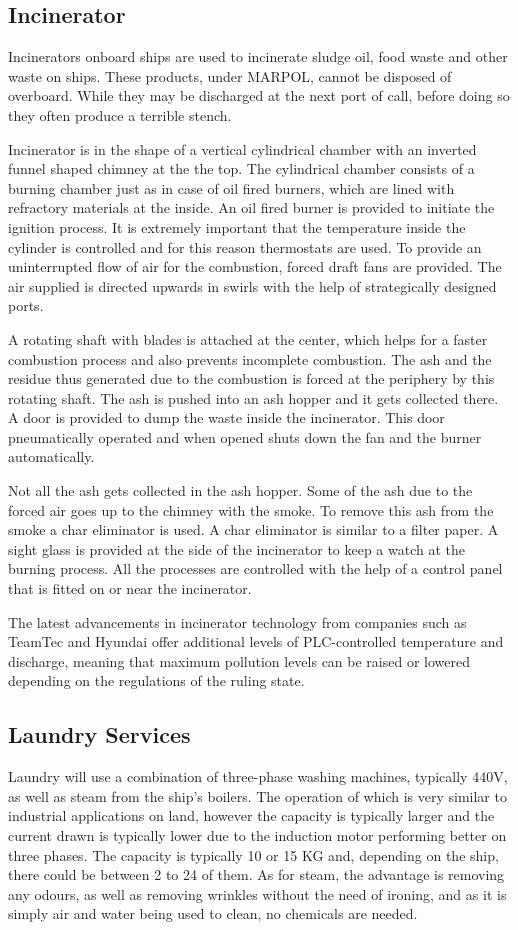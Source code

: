\documentclass[11pt,a4paper]{article}
\begin{document}
\subsection{Incinerator}
Incinerators onboard ships are used to incinerate sludge oil, food waste and other waste on ships. These products, under MARPOL, cannot be disposed of overboard. While they may be discharged at the next port of call, before doing so they often produce a terrible stench.

Incinerator is in the shape of a vertical cylindrical chamber with an inverted funnel shaped chimney at the the top. The cylindrical chamber consists of a burning chamber just as in case of oil fired burners, which are lined with refractory materials at the inside. An oil fired burner is provided to initiate the ignition process. It is extremely important that the temperature inside the cylinder is controlled and for this reason thermostats are used. To provide an uninterrupted flow of air for the combustion, forced draft fans are provided. The air supplied is directed upwards in swirls with the help of strategically designed ports.

A rotating shaft with blades is attached at the center, which helps for a faster combustion process and also prevents incomplete combustion. The ash and the residue thus generated due to the combustion is forced at the periphery by this rotating shaft. The ash is pushed into an ash hopper and it gets collected there. A door is provided to dump the waste inside the incinerator. This door pneumatically operated and when opened shuts down the fan and the burner automatically.

Not all the ash gets collected in the ash hopper. Some of the ash due to the forced air goes up to the chimney with the smoke. To remove this ash from the smoke a char eliminator is used. A char eliminator is similar to a filter paper. A sight glass is provided at the side of the incinerator to keep a watch at the burning process. All the processes are controlled with the help of a control panel that is fitted on or near the incinerator.

The latest advancements in incinerator technology from companies such as TeamTec and Hyundai offer additional levels of PLC-controlled temperature and discharge, meaning that maximum pollution levels can be raised or lowered depending on the regulations of the ruling state.
\subsection{Laundry Services}
Laundry will use a combination of three-phase washing machines, typically 440V, as well as steam from the ship's boilers. The operation of which is very similar to industrial applications on land, however the capacity is typically larger and the current drawn is typically lower due to the induction motor performing better on three phases. The capacity is typically 10 or 15 KG and, depending on the ship, there could be between 2 to 24 of them. As for steam, the advantage is removing any odours, as well as removing wrinkles without the need of ironing, and as it is simply air and water being used to clean, no chemicals are needed.
\end{document}
